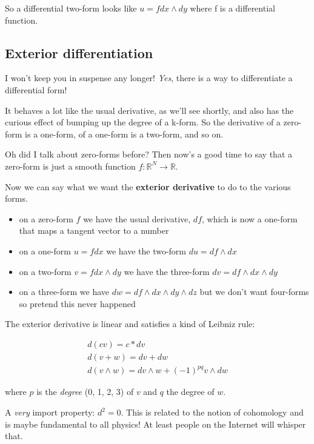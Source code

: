 \documentclass{article}
\begin{document}
So a differential two-form looks like $u = f dx \wedge dy$ where f is a
differential function.

\subsection {Exterior differentiation}

I won't keep you in suspense any longer! \textit{Yes}, there is a way to
differentiate a differential form!

It behaves a lot like the usual derivative, as we'll see shortly, and also has
the curious effect of bumping up the degree of a k-form. So the derivative of a
zero-form is a one-form, of a one-form is a two-form, and so on.

Oh did I talk about zero-forms before? Then now's a good time to say that a
zero-form is just a smooth function $f : \mathbb{R}^{N} \to \mathbb{R}$.

Now we can say what we want the \textbf{exterior derivative} to do to the
various forms.

\begin{itemize}
  \item on a zero-form $f$ we have the usual derivative, $df$, which is
    now a one-form that maps a tangent vector to a number
  \item on a one-form $u = f dx$ we have the two-form $du = df \wedge dx$
  \item on a two-form $v = f dx \wedge dy$ we have the three-form $dv = df \wedge dx \wedge
    dy$
  \item on a three-form we have $dw = df \wedge dx \wedge dy \wedge dz$ but
    we don't want four-forms so pretend this never happened
\end{itemize}

The exterior derivative is linear and satisfies a kind of Leibniz rule:

\begin{gather*}
  d(cv) = c * dv \\
  d(v + w) = dv + dw \\
  d(v \wedge w) = dv \wedge w + (-1)^{pq} v \wedge dw
\end{gather*}

where $p$ is the \textit{degree} (0, 1, 2, 3) of $v$ and $q$ the degree of $w$.

A \textit{very} import property: $d^{2} = 0$. This is related to the notion of
cohomology and is maybe fundamental to all physics! At least people on the
Internet will whisper that.
\end{document}
